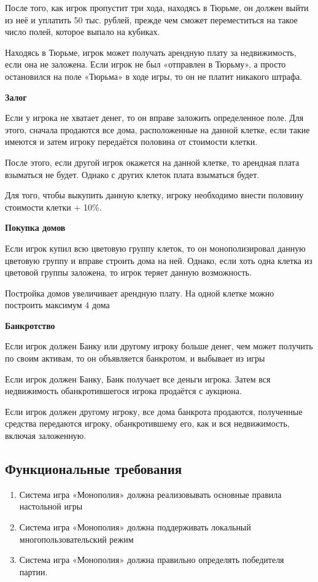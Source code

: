 После того, как игрок пропустит три хода, находясь в Тюрьме, он должен выйти из неё и уплатить 50 тыс. рублей, прежде чем сможет переместиться на такое число полей, которое выпало на кубиках. 

Находясь в Тюрьме, игрок может получать арендную плату за недвижимость, если она не заложена. Если игрок не был «отправлен в Тюрьму», а просто остановился на поле «Тюрьма» в ходе игры, то он не платит никакого штрафа.

\textbf{Залог}

Если у игрока не хватает денег, то он вправе заложить определенное поле. Для этого, сначала продаются все дома, расположенные на данной клетке, если такие имеются и затем игроку передаётся половина от стоимости клетки. 

После этого, если другой игрок окажется на данной клетке, то арендная плата взыматься не будет. Однако с других клеток плата взыматься будет.

Для того, чтобы выкупить данную клетку, игроку необходимо внести половину стоимости клетки + 10\%.

\textbf{Покупка домов}

Если игрок купил всю цветовую группу клеток, то он монополизировал данную цветовую группу и вправе строить дома на ней. Однако, если хоть одна клетка из цветовой группы заложена, то игрок теряет данную возможность.

Постройка домов увеличивает арендную плату. На одной клетке можно построить максимум 4 дома

\textbf{Банкротство}

Если игрок должен Банку или другому игроку больше денег, чем может получить по своим активам, то он объявляется банкротом, и выбывает из игры

Если игрок должен Банку, Банк получает все деньги игрока. Затем вся недвижимость обанкротившегося игрока продаётся с аукциона.

Если игрок должен другому игроку, все дома банкрота продаются, полученные средства передаются игроку, обанкротившему его, как и вся недвижимость, включая заложенную.
\subsection{Функциональные требования}
\begin{spacing}{0.9}
\begin{enumerate}
    \item Система игра «Монополия» должна реализовывать основные правила настольной игры 
    \item Система игра «Монополия» должна поддерживать локальный многопользовательский режим
    \item Система игра «Монополия» должна правильно определять победителя партии.
\end{enumerate}
\end{spacing}
